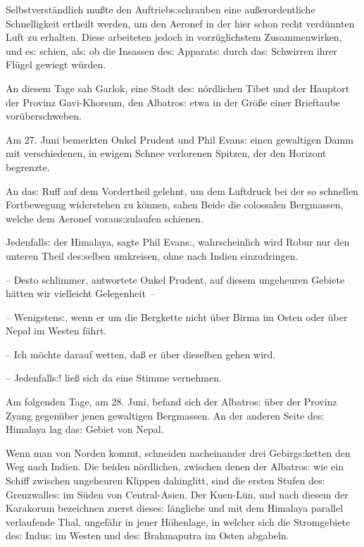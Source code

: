 \documentclass[oneside,12pt]{book}
\newcommand{\s}{s:}
\begin{document}
Selbstverst\"andlich mu{\ss}te den Auftrieb{\s}schrauben eine
au{\ss}erordentliche Schnelligkeit ertheilt werden, um den Aeronef in
der hier schon recht verd\"unnten Luft zu erhalten. Diese arbeiteten
jedoch in vorz\"uglichstem Zusammenwirken, und e{\s} schien, al{\s}
ob die Insassen de{\s} Apparat{\s} durch da{\s} Schwirren ihrer
Fl\"ugel gewiegt w\"urden.

An diesem Tage sah Garlok, eine Stadt de{\s} n\"ordlichen Tibet und
der Hauptort der Provinz Gavi-Khorsum, den {\glqq}Albatro{\s}{\grqq}
etwa in der Gr\"o{\ss}e einer Brieftaube vor\"uberschweben.

Am 27. Juni bemerkten Onkel Prudent und Phil Evan{\s} einen
gewaltigen Damm mit verschiedenen, in ewigem Schnee verlorenen
Spitzen, der den Horizont begrenzte.

An da{\s} Ruff auf dem Vordertheil gelehnt, um dem Luftdruck bei der
so schnellen Fortbewegung widerstehen zu k\"onnen, sahen Beide die
colossalen Bergmassen, welche dem Aeronef vorau{\s}zulaufen schienen.

{\glqq}Jedenfall{\s} der Himalaya, sagte Phil Evan{\s},
wahrscheinlich wird Robur nur den unteren Theil de{\s}selben
umkreisen, ohne nach Indien einzudringen.

-- Desto schlimmer, antwortete Onkel Prudent, auf diesem ungeheuren
Gebiete h\"atten wir vielleicht Gelegenheit~--

-- Wenigsten{\s}, wenn er um die Bergkette nicht \"uber Birma im
Osten oder \"uber Nepal im Westen f\"ahrt.

-- Ich m\"ochte darauf wetten, da{\ss} er \"uber dieselben gehen
wird.

-- Jedenfall{\s}!{\grqq} lie{\ss} sich da eine Stimme vernehmen.

Am folgenden Tage, am 28. Juni, befand sich der {\glqq}Albatro{\s}{\grqq}
\"uber der Provinz Zyang gegen\"uber jenen gewaltigen Bergmassen. An
der anderen Seite de{\s} Himalaya lag da{\s} Gebiet von Nepal.

Wenn man von Norden kommt, schneiden nacheinander drei
Gebirg{\s}ketten den Weg nach Indien. Die beiden n\"ordlichen,
zwischen denen der {\glqq}Albatro{\s}{\grqq} wie ein Schiff zwischen
ungeheuren Klippen dahinglitt, sind die ersten Stufen de{\s}
Grenzwalle{\s} im S\"uden von Central-Asien. Der Kuen-L\"un, und nach
diesem der Karakorum bezeichnen zuerst diese{\s} l\"angliche und mit
dem Himalaya parallel verlaufende Thal, ungef\"ahr in jener
H\"ohenlage, in welcher sich die Stromgebiete de{\s} Indu{\s} im
Westen und de{\s} Brahmaputra im Osten abgabeln.
\end{document}
